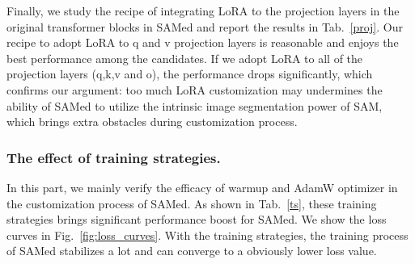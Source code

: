 \documentclass[runningheads]{llncs}
\begin{document}
Finally, we study the recipe of integrating LoRA to the projection layers in the original transformer blocks in SAMed and report the results in Tab.~\ref{proj}. Our recipe to adopt LoRA to q and v projection layers is reasonable and enjoys the best performance among the candidates. If we adopt LoRA to all of the projection layers (q,k,v and o), the performance drops significantly, which confirms our argument: too much LoRA customization may undermines the ability of SAMed to utilize the intrinsic image segmentation power of SAM, which brings extra obstacles during customization process.

\begin{table*}[t!]
\centering
\caption{Ablation study on the LoRA applied to different projection layers}
\footnotesize
{}
\label{proj}
\end{table*}

\subsubsection{The effect of training strategies.} In this part, we mainly verify the efficacy of warmup and AdamW optimizer in the customization process of SAMed. As shown in Tab.~\ref{ts}, these training strategies brings significant performance boost for SAMed. We show the loss curves in Fig.~\ref{fig:loss_curves}. With the training strategies, the training process of SAMed stabilizes a lot and can converge to a obviously lower loss value. 

\begin{table*}[t!]
\centering
\caption{Ablation study on the training strategies of SAMed.}
\footnotesize
{}
\label{ts}
\end{table*}
\end{document}
